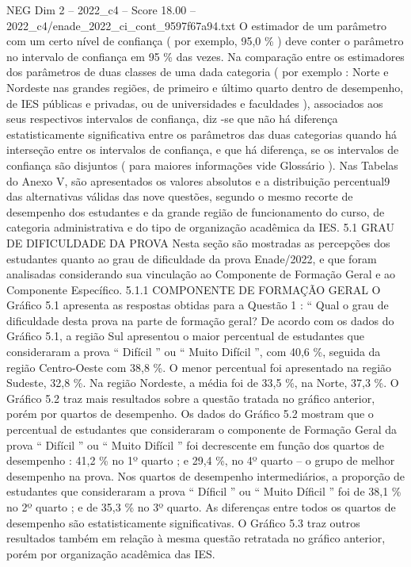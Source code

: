 \begin{textsample}{NEG Dim 2 – 2022\_c4 – Score 18.00 – 2022\_c4/enade\_2022\_ci\_cont\_9597f67a94.txt}
O estimador de um parâmetro com um certo nível de confiança ( por exemplo, 95,0 \% ) deve conter o parâmetro no intervalo de confiança em 95 \% das vezes.
Na comparação entre os estimadores dos parâmetros de duas classes de uma dada categoria ( por exemplo : Norte e Nordeste nas grandes regiões, de primeiro e último quarto dentro de desempenho, de IES públicas e privadas, ou de universidades e faculdades ), associados aos seus respectivos intervalos de confiança, diz -se que não há diferença estatisticamente significativa entre os parâmetros das duas categorias quando há interseção entre os intervalos de confiança, e que há diferença, se os intervalos de confiança são disjuntos ( para maiores informações vide Glossário ).
Nas Tabelas do Anexo V, são apresentados os valores absolutos e a distribuição percentual9 das alternativas válidas das nove questões, segundo o mesmo recorte de desempenho dos estudantes e da grande região de funcionamento do curso, de categoria administrativa e do tipo de organização acadêmica da IES. 5.1 GRAU DE DIFICULDADE DA PROVA Nesta seção são mostradas as percepções dos estudantes quanto ao grau de dificuldade da prova Enade/2022, e que foram analisadas considerando sua vinculação ao Componente de Formação Geral e ao Componente Específico. 5.1.1 COMPONENTE DE FORMAÇÃO GERAL O Gráfico 5.1 apresenta as respostas obtidas para a Questão 1 : “ Qual o grau de dificuldade desta prova na parte de formação geral?
De acordo com os dados do Gráfico 5.1, a região Sul apresentou o maior percentual de estudantes que consideraram a prova “ Difícil ” ou “ Muito Difícil ”, com 40,6 \%, seguida da região Centro-Oeste com 38,8 \%.
O menor percentual foi apresentado na região Sudeste, 32,8 \%.
Na região Nordeste, a média foi de 33,5 \%, na Norte, 37,3 \%.
O Gráfico 5.2 traz mais resultados sobre a questão tratada no gráfico anterior, porém por quartos de desempenho.
Os dados do Gráfico 5.2 mostram que o percentual de estudantes que consideraram o componente de Formação Geral da prova “ Difícil ” ou “ Muito Difícil ” foi decrescente em função dos quartos de desempenho : 41,2 \% no 1º quarto ; e 29,4 \%, no 4º quarto – o grupo de melhor desempenho na prova.
Nos quartos de desempenho intermediários, a proporção de estudantes que consideraram a prova “ Díficil ” ou “ Muito Díficil ” foi de 38,1 \% no 2º quarto ; e de 35,3 \% no 3º quarto.
As diferenças entre todos os quartos de desempenho são estatisticamente significativas.
O Gráfico 5.3 traz outros resultados também em relação à mesma questão retratada no gráfico anterior, porém por organização acadêmica das IES.

\end{textsample}
